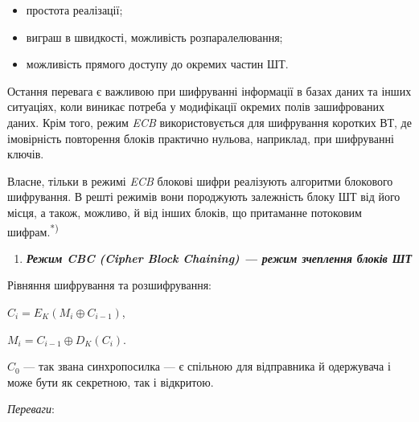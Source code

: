 \liststyleWWviiiNumliv
\begin{itemize}
\item простота реалізації;
\item виграш в швидкості, можливість розпаралелювання;
\item можливість прямого доступу до окремих частин ШТ.
\end{itemize}
Остання перевага є важливою при шифруванні інформації в базах даних та інших
ситуаціях, коли виникає потреба у модифікації окремих полів зашифрованих даних.
Крім того, режим \textit{ECB} використовується для шифрування коротких ВТ, де
імовірність повторення блоків практично нульова, наприклад, при шифруванні
ключів.

Власне, тільки в режимі \textit{ECB }блокові шифри реалізують алгоритми
блокового шифрування. В решті режимів  вони породжують залежність блоку ШТ від
його місця, а також, можливо, й від інших блоків, що притаманне потоковим
шифрам.\textsuperscript{*)}


\bigskip


\bigskip

\liststyleWWviiiNumxxi
\begin{enumerate}
\item {\bfseries\itshape
Режим CBC (Cipher Block Chaining) --- режим зчеплення блоків ШТ}
\end{enumerate}

\bigskip

Рівняння шифрування та розшифрування:

{\centering
 ${C_{{i}}=E_{{K}}(M_{{i}}{\oplus}C_{{i-1}})}$,
\par}

{\centering
 ${M_{{i}}=C_{{i-1}}{\oplus}D_{{K}}(C_{{i}})}$.
\par}

 ${C_{{0}}}$ --- так звана синхропосилка --- є спільною для відправника й одержувача
і може бути як секретною, так і відкритою.


\bigskip

\textit{Переваги}:

